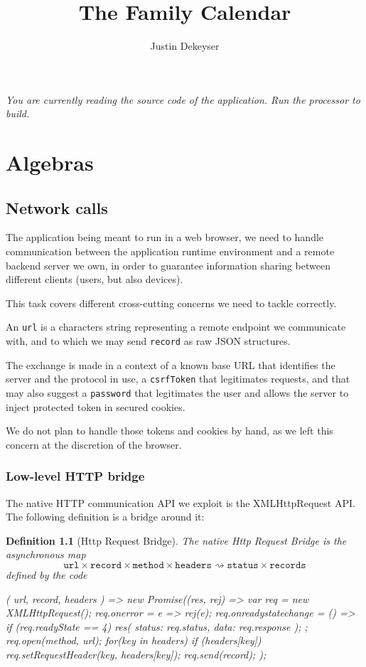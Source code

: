 \documentclass[12pt,a4paper]{report}
\author{Justin Dekeyser}
\title{The Family Calendar}
\newtheorem{definition}{Definition}
\newcommand{\word}[1]{\texttt{#1}}
\begin{document}
\maketitle

\begin{flushright}\it
You are currently reading the source code of the application.\linebreak
Run the processor to build.
\end{flushright}

\chapter{Algebras}

\section{Network calls}

The application being meant to run in a web browser, we need to handle
communication between the application runtime environment and a remote backend
server we own, in order to guarantee information sharing between different
clients (users, but also devices).

This task covers different cross-cutting concerns we need to tackle
correctly.

An \word{url} is a characters string representing a remote endpoint
we communicate with, and to which we may send \word{record} as raw
JSON structures.

The exchange is made in a context of a known base URL that identifies
the server and the protocol in use, a \word{csrfToken}
that legitimates requests, and that may also suggest a \word{password}
that legitimates the user and allows the server to inject protected 
token in secured cookies.

We do not plan to handle those tokens and cookies by hand, as we left this
concern at the discretion of the browser.

\subsection{Low-level HTTP bridge}

The native HTTP communication API we exploit is the XMLHttpRequest
API. The following definition is a bridge around it:

\begin{definition}[Http Request Bridge]\label{http_request_bridge}
The native Http Request Bridge is the asynchronous map
	\[ \word{url}\times\word{record}\times\word{method}\times\word{headers}
		\rightsquigarrow
	\word{status}\times\word{records} \]
defined by the code
\begin{code}
({ url, record, headers }) => new Promise((res, rej) => {
  var req = new XMLHttpRequest();
  req.onerror = e => rej(e);
  req.onreadystatechange = () => {
    if (req.readyState == 4)
      res({ status: req.status, data: req.response });
  };
  req.open(method, url);
  for(key in headers) if (headers[key])
    req.setRequestHeader(key, headers[key]);
  req.send(record);
});
\end{code}
\end{definition}
\end{document}
